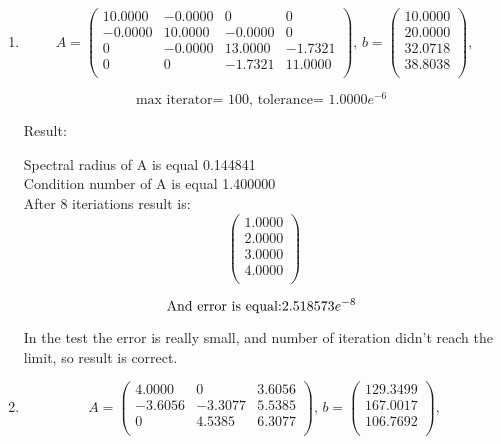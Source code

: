 \documentclass[12pt]{article}
\begin{document}
\begin{enumerate}

\vskip20pt

\item

\[
A= \begin{pmatrix}
   10.0000 &  -0.0000 &        0      &        0\\
   -0.0000  & 10.0000 &  -0.0000 &        0\\
         0       & -0.0000 & 13.0000  & -1.7321\\
         0       &  0           &-1.7321   & 11.0000\\
\end{pmatrix}\textbf{, }
b= \begin{pmatrix}
   10.0000\\
   20.0000\\
   32.0718\\
   38.8038\\
\end{pmatrix}\textbf{,}
\]

\[
\textrm{ max iterator= 100, tolerance= $1.0000e^{-6}$  }
\]

\pagebreak


Result:

Spectral radius of A is equal 0.144841 \\
Condition number of A is equal 1.400000\\ 
After 8 iteriations result is:\\
\[
\begin{pmatrix}
   1.0000\\
    2.0000\\
    3.0000\\
    4.0000\\
\end{pmatrix}
\]

\[
\textrm{And error is equal:$ 2.518573e^{-8}$ }
\]

In the test the error is really small, and number of iteration didn't reach the limit, so result is  correct.

\item

\[
A= \begin{pmatrix}
    4.0000  &       0   & 3.6056\\
   -3.6056   &-3.3077 &   5.5385\\
         0   & 4.5385  &  6.3077\\
\end{pmatrix}\textbf{, }
b= \begin{pmatrix}
  129.3499\\
  167.0017\\
  106.7692\\
\end{pmatrix}\textbf{,}
\]


\end{enumerate}
\end{document}
